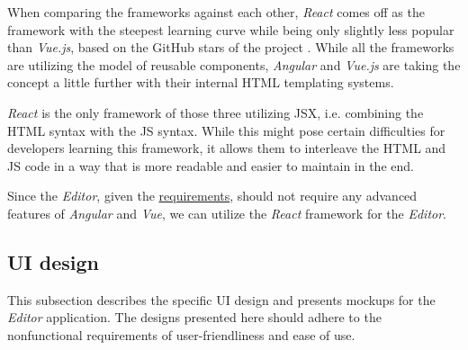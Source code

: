 When comparing the frameworks against each other, \textit{React} comes off as the framework with the steepest learning curve while being only slightly less popular than \textit{Vue.js}, based on the GitHub stars of the project .
While all the frameworks are utilizing the model of reusable components, \textit{Angular} and \textit{Vue.js} are taking the concept a little further with their internal \acs{HTML} templating systems.

\textit{React} is the only framework of those three utilizing \acs{JSX}, i.e. combining the \acs{HTML} syntax with the \acs{JS} syntax. 
While this might pose certain difficulties for developers learning this framework, it allows them to interleave the \acs{HTML} and \acs{JS} code in a way that is more readable and easier to maintain in the end.

Since the \textit{Editor}, given the \hyperref[requirements]{requirements}, should not require any advanced features of \textit{Angular} and \textit{Vue}, 
we can utilize the \textit{React} framework for the \textit{Editor}.

\subsection{UI design}

This subsection describes the specific \acs{UI} design and presents mockups for the \textit{Editor} application.
The designs presented here should adhere to the nonfunctional requirements of user-friendliness and ease of use.